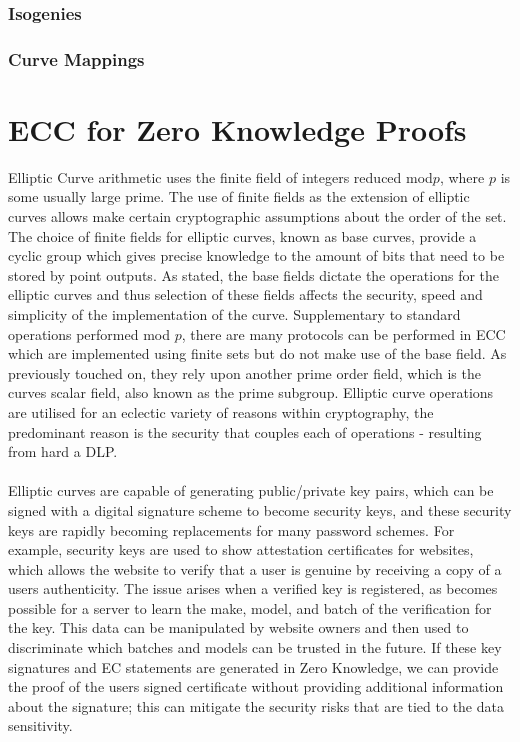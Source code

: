\documentclass{article}
\theoremstyle{definition}
\theoremstyle{remark}
\begin{document}
	\subsubsection{Isogenies}
	
	\subsubsection {Curve Mappings}
	
	\section{ECC for Zero Knowledge Proofs}
	
	Elliptic Curve arithmetic uses the finite field of integers reduced mod$p$, where $p$ is some usually large prime. The use of finite fields as the extension of elliptic curves allows  make certain cryptographic assumptions about the order of the set. The choice of finite fields for elliptic curves, known as base curves, provide a cyclic group which gives precise knowledge to the amount of bits that need to be stored by point outputs. As stated, the base fields dictate the operations for the elliptic curves and thus selection of these fields affects the security, speed and simplicity of the implementation of the curve. Supplementary to standard operations performed mod $p$, there are many protocols can be performed in ECC which are implemented using finite sets but do not make use of the base field. As previously touched on, they rely upon another prime order field, which is the curves scalar field, also known as the prime subgroup. Elliptic curve operations are utilised for an eclectic variety of reasons within cryptography, the predominant reason is the security that couples each of operations - resulting from hard a DLP.\\\\ 
	
	Elliptic curves are capable of generating public/private key pairs, which can be signed with a digital signature scheme to become security keys, and these security keys are rapidly becoming replacements for many password schemes. For example, security keys are used to show attestation certificates for websites, which allows the website to verify that a user is genuine by receiving a copy of a users authenticity. The issue arises when a verified key is registered, as becomes possible for a server to learn the make, model, and batch of the verification for the key.  This data can be manipulated by website owners and then used to discriminate which batches and models can be trusted in the future. If these key signatures and EC statements are generated in Zero Knowledge, we can provide the proof of the users signed certificate without providing additional information about the signature; this can mitigate the security risks that are tied to the data sensitivity.\\\\ 
	
\end{document}
